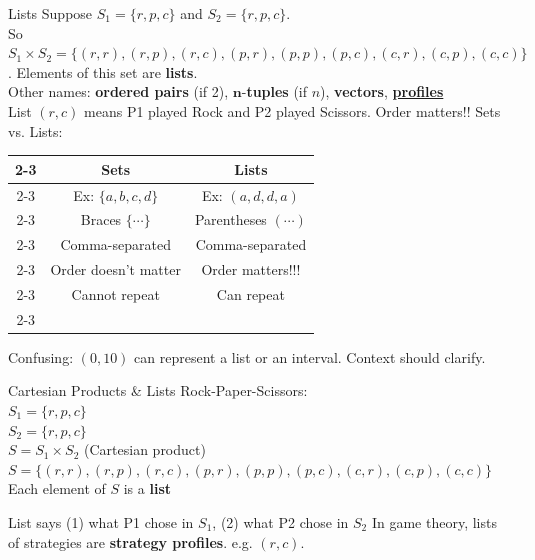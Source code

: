 \begin{frame}{Lists}
Suppose $S_1=\{r,p,c\}$ and $S_2=\{r,p,c\}$.\\
So $S_1\times S_2=\{(r,r),(r,p),(r,c),(p,r),(p,p),(p,c),(c,r),(c,p),(c,c)\}$.
\bsk
Elements of this set are \textbf{lists}.\\
Other names: \textbf{ordered pairs} (if 2), $\bm{n}$-\textbf{tuples} (if $n$), \textbf{vectors}, \uline{\textbf{profiles}}\\
List $(r,c)$ means P1 played Rock and P2 played Scissors. Order matters!!
\bsk
Sets vs. Lists:
\begin{center}
\begin{tabular}{c|c|c|}
\cline{2-3}
 & \textbf{Sets} & \textbf{Lists}\\
\cline{2-3}
 & Ex: $\{a,b,c,d\}$ & Ex: $(a,d,d,a)$ \\
\cline{2-3}
 & Braces $\{\cdots\}$ & Parentheses $(\cdots)$  \\
\cline{2-3}
 & Comma-separated & Comma-separated \\
\cline{2-3}
 & Order doesn't matter & Order matters!!! \\
\cline{2-3}
 & Cannot repeat & Can repeat \\
\cline{2-3}
\end{tabular}
\end{center}
Confusing: $(0,10)$ can represent a list or an interval. Context should clarify.
\end{frame}

\begin{frame}{Cartesian Products \& Lists}
    Rock-Paper-Scissors:\\
    $S_1=\{r,p,c\}$\\
    $S_2=\{r,p,c\}$\\
    $S=S_1\times S_2$ (Cartesian product)\\
    $S=\{(r,r),(r,p),(r,c),(p,r),(p,p),(p,c),(c,r),(c,p),(c,c)\}$\\
    Each element of $S$ is a \textbf{list}\vspace{0.5in}
    
    List says (1) what P1 chose in $S_1$, (2) what P2 chose in $S_2$ 
    \vfill
    In game theory, lists of strategies are \textbf{strategy profiles}. e.g. $(r,c)$.
    \vspace{-1in}
\end{frame}

